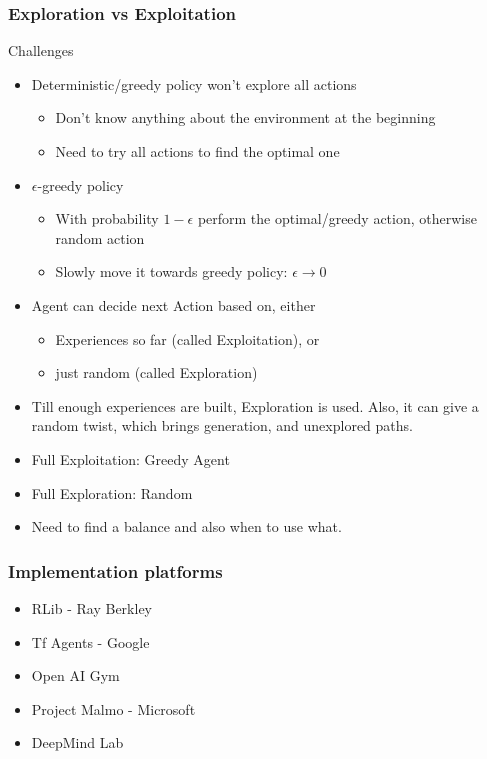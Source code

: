 \begin{frame}[fragile]\frametitle{Exploration vs Exploitation}

Challenges

\begin{itemize}
\item Deterministic/greedy policy won’t explore all actions
	\begin{itemize}
	\item Don’t know anything about the environment at the beginning
	\item Need to try all actions to find the optimal one
	\end{itemize}

\item $\epsilon$-greedy policy
	\begin{itemize}
	\item	With probability $1-\epsilon$ perform the optimal/greedy action, otherwise random action
	\item	Slowly move it towards greedy policy: $\epsilon \rightarrow 0$
	\end{itemize}
\item Agent can decide next Action based on, either
	\begin{itemize}
	\item Experiences so far (called Exploitation), or
	\item just random (called Exploration)
	\end{itemize}
\item Till enough experiences are built, Exploration is used. Also, it can give a random twist, which brings generation, and unexplored paths.
\item Full Exploitation: Greedy Agent
\item Full Exploration: Random
\item Need to find a balance and also when to use what.
\end{itemize}
\end{frame}

\begin{frame}[fragile]\frametitle{Implementation platforms}

\begin{itemize}
\item RLib - Ray Berkley
\item Tf Agents - Google
\item Open AI Gym
\item Project Malmo - Microsoft
\item DeepMind Lab
\end{itemize}

\end{frame}

